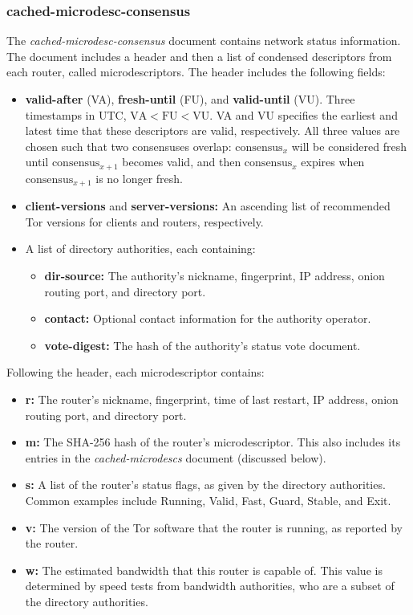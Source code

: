 \subsubsection{cached-microdesc-consensus}

The \emph{cached-microdesc-consensus} document contains network status information. The document includes a header and then a list of condensed descriptors from each router, called microdescriptors. The header includes the following fields:

\begin{itemize}
	\item \textbf{valid-after} (VA), \textbf{fresh-until} (FU), and \textbf{valid-until} (VU). Three timestamps in UTC, $ \mathrm{VA} < \mathrm{FU} < \mathrm{VU} $. VA and VU specifies the earliest and latest time that these descriptors are valid, respectively. All three values are chosen such that two consensuses overlap: $ \mathrm{consensus}_{x} $ will be considered fresh until $ \mathrm{consensus}_{x+1} $ becomes valid, and then $ \mathrm{consensus}_{x} $ expires when $ \mathrm{consensus}_{x+1} $ is no longer fresh.
	\item \textbf{client-versions} and \textbf{server-versions:} An ascending list of recommended Tor versions for clients and routers, respectively.
	\item A list of directory authorities, each containing:
		\begin{itemize}
			\item \textbf{dir-source:} The authority's nickname, fingerprint, IP address, onion routing port, and directory port.
			\item \textbf{contact:} Optional contact information for the authority operator.
			\item \textbf{vote-digest:} The hash of the authority's status vote document.
		\end{itemize}
\end{itemize}

Following the header, each microdescriptor contains:

\begin{itemize}
	\item \textbf{r:} The router's nickname, fingerprint, time of last restart, IP address, onion routing port, and directory port.
	\item \textbf{m:} The SHA-256 hash of the router's microdescriptor. This also includes its entries in the \emph{cached-microdescs} document (discussed below).
	\item \textbf{s:} A list of the router's status flags, as given by the directory authorities. Common examples include Running, Valid, Fast, Guard, Stable, and Exit.
	\item \textbf{v:} The version of the Tor software that the router is running, as reported by the router.
	\item \textbf{w:} The estimated bandwidth that this router is capable of. This value is determined by speed tests from bandwidth authorities, who are a subset of the directory authorities.
\end{itemize}

